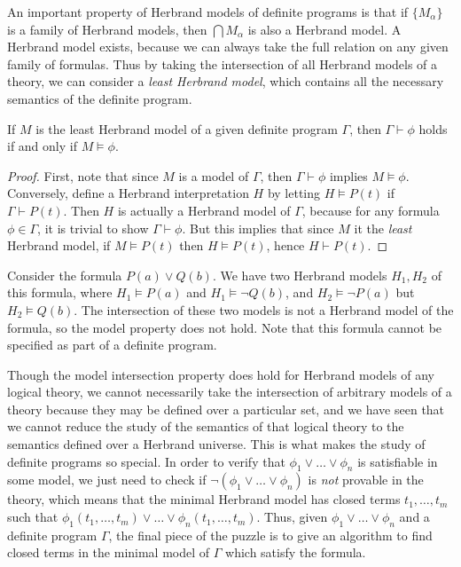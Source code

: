 An important property of Herbrand models of definite programs is that if $\{ M_\alpha \}$ is a family of Herbrand models, then $\bigcap M_\alpha$ is also a Herbrand model. A Herbrand model exists, because we can always take the full relation on any given family of formulas. Thus by taking the intersection of all Herbrand models of a theory, we can consider a \emph{least Herbrand model}, which contains all the necessary semantics of the definite program.

\begin{theorem}
    If $M$ is the least Herbrand model of a given definite program $\Gamma$, then $\Gamma \vdash \phi$ holds if and only if $M \vDash \phi$.
\end{theorem}
\begin{proof}
    First, note that since $M$ is a model of $\Gamma$, then $\Gamma \vdash \phi$ implies $M \vDash \phi$. Conversely, define a Herbrand interpretation $H$ by letting $H \vDash P(t)$ if $\Gamma \vdash P(t)$. Then $H$ is actually a Herbrand model of $\Gamma$, because for any formula $\phi \in \Gamma$, it is trivial to show $\Gamma \vdash \phi$. But this implies that since $M$ it the {\it least} Herbrand model, if $M \vDash P(t)$ then $H \vDash P(t)$, hence $H \vdash P(t)$.
\end{proof}

\begin{example}
    Consider the formula $P(a) \vee Q(b)$. We have two Herbrand models $H_1, H_2$ of this formula, where $H_1 \vDash P(a)$ and $H_1 \vDash \neg Q(b)$, and $H_2 \vDash \neg P(a)$ but $H_2 \vDash Q(b)$. The intersection of these two models is not a Herbrand model of the formula, so the model property does not hold. Note that this formula cannot be specified as part of a definite program.
\end{example}

Though the model intersection property does hold for Herbrand models of any logical theory, we cannot necessarily take the intersection of arbitrary models of a theory because they may be defined over a particular set, and we have seen that we cannot reduce the study of the semantics of that logical theory to the semantics defined over a Herbrand universe. This is what makes the study of definite programs so special. In order to verify that $\phi_1 \vee \dots \vee \phi_n$ is satisfiable in some model, we just need to check if $\neg (\phi_1 \vee \dots \vee \phi_n)$ is {\it not} provable in the theory, which means that the minimal Herbrand model has closed terms $t_1, \dots, t_m$ such that $\phi_1(t_1, \dots, t_m) \vee \dots \vee \phi_n(t_1, \dots, t_m)$. Thus, given $\phi_1 \vee \dots \vee \phi_n$ and a definite program $\Gamma$, the final piece of the puzzle is to give an algorithm to find closed terms in the minimal model of $\Gamma$ which satisfy the formula.

